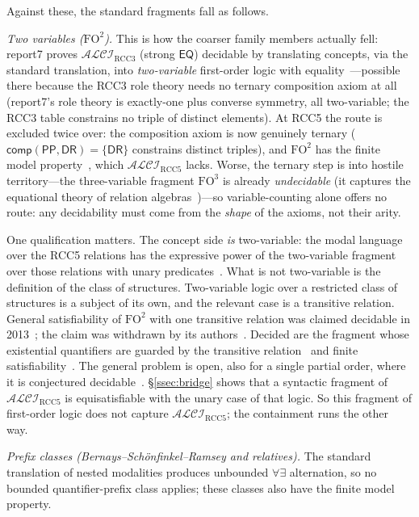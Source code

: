 \documentclass[11pt]{article}
\newcommand{\ALCIRCC}[1]{\mathcal{ALCI}_{\mathrm{RCC#1}}}
\newcommand{\DR}{\mathsf{DR}}
\newcommand{\PP}{\mathsf{PP}}
\newcommand{\EQ}{\mathsf{EQ}}
\newcommand{\comp}{\ensuremath{\mathsf{comp}}}
\theoremstyle{plain}
\theoremstyle{definition}
\begin{document}
\noindent Against these, the standard fragments fall as follows.

\emph{Two variables ($\mathrm{FO}^2$).} This is how the coarser family
members actually fell: report7 proves $\ALCIRCC3$ (strong $\EQ$) decidable by
translating concepts, via the standard translation, into \emph{two-variable}
first-order logic with equality~\cite{Wessel2003}---possible there because
the RCC3 role theory needs no ternary composition axiom at all (report7's
role theory is exactly-one plus converse symmetry, all two-variable; the
RCC3 table constrains no triple of distinct elements). At RCC5 the route is
excluded twice over: the composition axiom is now genuinely ternary
($\comp(\PP,\DR)=\{\DR\}$ constrains distinct triples), and $\mathrm{FO}^2$
has the finite model property~\cite{GradelKolaitisVardi1997}, which
$\ALCIRCC5$ lacks. Worse, the ternary step is into
hostile territory---the three-variable fragment $\mathrm{FO}^3$ is already
\emph{undecidable} (it captures the equational theory of relation
algebras~\cite{TarskiGivant1987})---so variable-counting alone offers no
route: any decidability must come from the \emph{shape} of the axioms, not
their arity.

One qualification matters. The concept side \emph{is} two-variable: the modal
language over the RCC5 relations has the expressive power of the two-variable
fragment over those relations with unary
predicates~\cite[\S8]{LutzWolter2006}. What is not two-variable is the
definition of the class of structures. Two-variable logic over a restricted
class of structures is a subject of its own, and the relevant case is a
transitive relation. General satisfiability of $\mathrm{FO}^2$ with one
transitive relation was claimed decidable in 2013~\cite{SzwastTendera2013};
the claim was withdrawn by its authors~\cite{SzwastTendera2018}. Decided are
the fragment whose existential quantifiers are guarded by the transitive
relation~\cite{SzwastTendera2018} and finite
satisfiability~\cite{PrattHartmann2018}. The general problem is open, also
for a single partial order, where it is conjectured
decidable~\cite{MarzecTendera2026}. \S\ref{ssec:bridge} shows that a
syntactic fragment of $\ALCIRCC{5}$ is equisatisfiable with the unary case of
that logic. So this fragment of first-order logic does not capture
$\ALCIRCC{5}$; the containment runs the other way.

\emph{Prefix classes (Bernays--Sch\"onfinkel--Ramsey and relatives).} The
standard translation of nested modalities produces unbounded
$\forall\exists$ alternation, so no bounded quantifier-prefix class applies;
these classes also have the finite model property.
\end{document}
